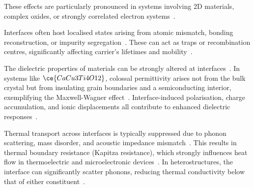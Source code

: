\label{interface_effects_2D_oxides} %

These effects are particularly pronounced in systems involving 2D materials, complex oxides, or strongly correlated electron systems~\cite{Leitherer2023-ew}.

\label{band_alignment_interfaces} %

\label{interface_states} Interfaces often host localised states arising from atomic mismatch, bonding reconstruction, or impurity segregation~\nocite{}.
These can act as traps or recombination centres, significantly affecting carrier's lifetimes and mobility~\cite{Hepplestone2010-vw, Maji2021-kc, Davies2024-ju}.

\label{dielectric_interface_permittivity} The dielectric properties of materials can be strongly altered at interfaces~\nocite{}.
In systems like $\ce{CaCu3Ti4O12}$, colossal permittivity arises not from the bulk crystal but from insulating grain boundaries and a semiconducting interior, exemplifying the Maxwell-Wagner effect~\cite{Taylor2019-cpmech}.
Interface-induced polarisation, charge accumulation, and ionic displacements all contribute to enhanced dielectric responses~\cite{Leung2020-tv, Low2025-on}.

\label{thermal_transport_interfaces} Thermal transport across interfaces is typically suppressed due to phonon scattering, mass disorder, and acoustic impedance mismatch~\cite{Liu2025-phonon}.
This results in thermal boundary resistance (Kapitza resistance), which strongly influences heat flow in thermoelectric and microelectronic devices~\cite{Hepplestone2010-vw, Leung2020-tv, Khot2025-hh}.
In heterostructures, the interface can significantly scatter phonons, reducing thermal conductivity below that of either constituent~\cite{Di_Liberto2022-gz, Davies2024-ju}.

